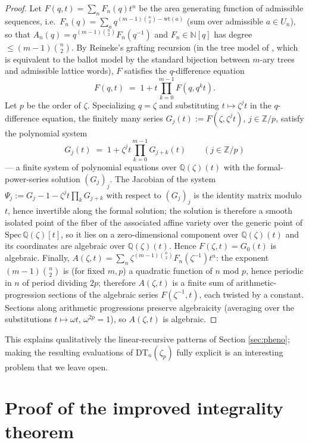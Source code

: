 \documentclass[11pt]{amsart}
\theoremstyle{definition}
\newcommand{\ZZ}{\mathbb{Z}}
\newcommand{\NN}{\mathbb{N}}
\newcommand{\QQ}{\mathbb{Q}}
\newcommand{\DT}{\mathrm{DT}}
\newcommand{\wt}{\mathrm{wt}}
\begin{document}
\begin{proof}
Let $F(q,t)=\sum_n F_n(q)t^n$ be the area generating function of admissible sequences, i.e.\ $F_n(q)=\sum_a q^{(m-1)\binom n2-\wt(a)}$ (sum over admissible $a\in U_n$), so that $A_n(q)=q^{(m-1)\binom n2}F_n(q^{-1})$ and $F_n\in\NN[q]$ has degree $\le(m-1)\binom n2$. By Reineke's grafting recursion \cite[Cor.~2.2(1)]{Rei1102} (in the tree model of \cite{Rei0306}, which is equivalent to the ballot model by the standard bijection between $m$-ary trees and admissible lattice words), $F$ satisfies the $q$-difference equation
\[
F(q,t)\;=\;1+t\prod_{k=0}^{m-1}F(q,q^kt).
\]
Let $p$ be the order of $\zeta$. Specializing $q=\zeta$ and substituting $t\mapsto\zeta^jt$ in the $q$-difference equation, the finitely many series $G_j(t):=F(\zeta,\zeta^jt)$, $j\in\ZZ/p$, satisfy the polynomial system
\[
G_j(t)\;=\;1+\zeta^{j}t\prod_{k=0}^{m-1}G_{j+k}(t)\qquad(j\in\ZZ/p)
\]
--- a finite system of polynomial equations over $\QQ(\zeta)(t)$ with the formal-power-series solution $(G_j)_j$. The Jacobian of the system $\Psi_j:=G_j-1-\zeta^jt\prod_kG_{j+k}$ with respect to $(G_j)_j$ is the identity matrix modulo $t$, hence invertible along the formal solution; the solution is therefore a smooth isolated point of the fiber of the associated affine variety over the generic point of $\mathrm{Spec}\,\QQ(\zeta)[t]$, so it lies on a zero-dimensional component over $\QQ(\zeta)(t)$ and its coordinates are algebraic over $\QQ(\zeta)(t)$. Hence $F(\zeta,t)=G_0(t)$ is algebraic. Finally, $A(\zeta,t)=\sum_n \zeta^{(m-1)\binom n2}F_n(\zeta^{-1})t^n$: the exponent $(m-1)\binom n2$ is (for fixed $m,p$) a quadratic function of $n$ mod $p$, hence periodic in $n$ of period dividing $2p$; therefore $A(\zeta,t)$ is a finite sum of arithmetic-progression sections of the algebraic series $F(\zeta^{-1},t)$, each twisted by a constant. Sections along arithmetic progressions preserve algebraicity (averaging over the substitutions $t\mapsto\omega t$, $\omega^{2p}=1$), so $A(\zeta,t)$ is algebraic.
\end{proof}

This explains qualitatively the linear-recursive patterns of Section \ref{sec:pheno}; making the resulting evaluations of $\DT_n(\zeta_p)$ fully explicit is an interesting problem that we leave open.

\section{Proof of the improved integrality theorem}\label{sec:arith}
\end{document}
